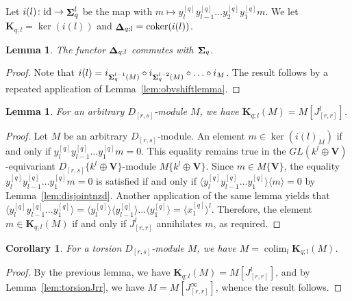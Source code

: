 \documentclass[12pt]{amsart}
\newcommand{\bK}{\mathbf{K}}
\newcommand{\bV}{\mathbf{V}}
\DeclareMathOperator{\coker}{coker}
\newcommand{\id}{\mathrm{id}}
\DeclareMathOperator{\Sh}{\bf{\Sigma}}
\DeclareMathOperator{\De}{\bf{\Delta}}
\DeclareMathOperator{\colim}{colim}
\newcommand{\Drs}{D_{[r,s]}}
\newcommand{\Jrr}{J_{[r,r]}}
\newcommand{\mShq}{\Sh_{q}}
\newcommand{\mKql}{\bK_{q;l}}
\newcommand{\mDel}{\De_{q;l}}
\numberwithin{equation}{section}
\newtheorem{lemma}[equation]{Lemma}
\newtheorem{corollary}[equation]{Corollary}
\theoremstyle{definition}
\theoremstyle{plain}
\begin{document}
Let $i(l) \colon \id \to \mShq^l$ be the map with $m \mapsto y_l^{[q]}y_{l-1}^{[q]} \ldots y_2^{[q]}y_1^{[q]}m$. We let $\mKql = \ker(i(l))$ and $\mDel = \coker(i(l))$.

\begin{lemma}\label{lem:mDelcommmShq}
The functor $\mDel$ commutes with $\mShq$.
\end{lemma}
\begin{proof}
Note that $i(l) = i_{\mShq^{l-1}(M)} \circ i_{\mShq^{l-2}(M)} \circ \ldots \circ i_M$. The result follows by a repeated application of Lemma~\ref{lem:obvshiftlemma}.
\end{proof}

\begin{lemma}
    For an arbitrary $\Drs$-module $M$, we have $\mKql(M) = M[\Jrr^l]$.
\end{lemma}
\begin{proof}
  Let $M$ be an arbitrary $\Drs$-module. An element $m \in \ker(i(l)_M)$ if and only if 
   $y_l^{[q]}y_{l-1}^{[q]} \ldots y_1^{[q]}m = 0$. This equality remains true in the $GL(k^l \oplus \bV)$-equivariant $\Drs\{k^l \oplus \bV\}$-module $M\{k^l \oplus \bV\}$. Since $m \in M\{\bV\}$, the equality  $y_l^{[q]}y_{l-1}^{[q]} \ldots y_1^{[q]}m = 0$ is satisfied if and only if $\langle y_l^{[q]}y_{l-1}^{[q]} \ldots y_1^{[q]}\rangle \langle m \rangle = 0$ by Lemma~\ref{lem:disjointnzd}. Another application of the same lemma yields that $\langle y_l^{[q]}y_{l-1}^{[q]} \ldots y_1^{[q]} \rangle =  \langle y_l^{[q]} \rangle \langle y_{l-1}^{[q]} \rangle  \ldots \langle y_1^{[q]} \rangle = \langle x_1^{[q]} \rangle^l$.  Therefore, the element $m \in \mKql(M)$ if and only if $\Jrr^l$ annihilates $m$, as required.
\end{proof}


\begin{corollary}\label{cor:colim}
For a torsion $\Drs$-module $M$, we have $M = \colim_l \mKql(M)$.
\end{corollary}
\begin{proof}
   By the previous lemma, we have $\mKql(M) = M[\Jrr^l]$, and by Lemma~\ref{lem:torsionJrr}, we have  $M = M[\Jrr^{\infty}]$, whence the result follows.
\end{proof}
\end{document}
